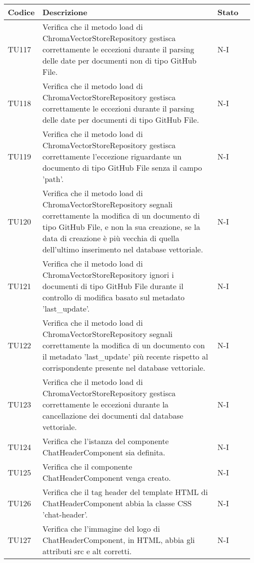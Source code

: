 \begin{table}[h!]
    \centering
    \renewcommand{\arraystretch}{1.5}
    \begin{tabularx}{\textwidth}{|p{}|X|p{}|p{}|}\hline
    \rowcolor[HTML]{FFD700}
    \textbf{Codice} & \textbf{Descrizione} & \textbf{Stato} \\ \hline
    TU117 & Verifica che il metodo load di ChromaVectorStoreRepository gestisca correttamente le eccezioni durante il parsing delle date per documenti non di tipo GitHub File. &  N-I \\ \hline
    TU118 & Verifica che il metodo load di ChromaVectorStoreRepository gestisca correttamente le eccezioni durante il parsing delle date per documenti di tipo GitHub File. &  N-I \\ \hline
    TU119 & Verifica che il metodo load di ChromaVectorStoreRepository gestisca correttamente l'eccezione riguardante un documento di tipo GitHub File senza il campo 'path'. &  N-I \\ \hline
    TU120 & Verifica che il metodo load di ChromaVectorStoreRepository segnali correttamente la modifica di un documento di tipo GitHub File, e non la sua creazione, se la data di creazione è più vecchia di quella dell'ultimo inserimento nel database vettoriale. &  N-I \\ \hline
    TU121 & Verifica che il metodo load di ChromaVectorStoreRepository ignori i documenti di tipo GitHub File durante il controllo di modifica basato sul metadato 'last\_update'. &  N-I \\ \hline
    TU122 & Verifica che il metodo load di ChromaVectorStoreRepository segnali correttamente la modifica di un documento con il metadato 'last\_update' più recente rispetto al corrispondente presente nel database vettoriale. &  N-I \\ \hline
    TU123 & Verifica che il metodo load di ChromaVectorStoreRepository gestisca correttamente le eccezioni durante la cancellazione dei documenti dal database vettoriale. &  N-I \\ \hline
    TU124 & Verifica che l'istanza del componente ChatHeaderComponent sia definita. &  N-I \\ \hline
    TU125 & Verifica che il componente ChatHeaderComponent venga creato. &  N-I \\ \hline
    TU126 & Verifica che il tag header del template HTML di ChatHeaderComponent abbia la classe CSS 'chat-header'. &  N-I \\ \hline
    TU127 & Verifica che l'immagine del logo di ChatHeaderComponent, in HTML, abbia gli attributi src e alt corretti. &  N-I \\ \hline

\end{tabularx}
\end{table}
